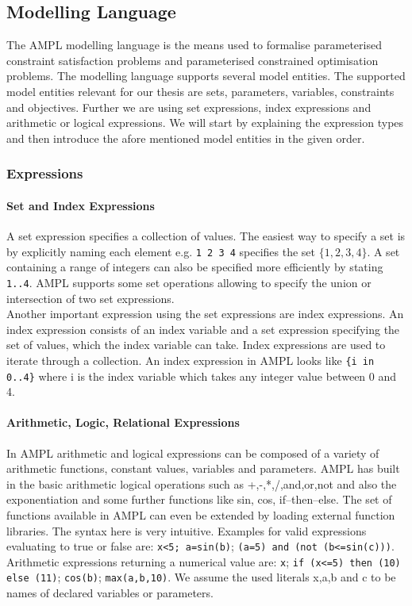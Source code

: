 \subsection{Modelling Language}
The AMPL modelling language is the means used to formalise parameterised constraint satisfaction problems and parameterised constrained optimisation problems. 
The modelling language supports several model entities. The supported model entities relevant for our thesis are sets, parameters, variables, constraints and objectives. Further we are using set expressions, index expressions and arithmetic or logical expressions. We will start by explaining the expression types and then introduce the afore mentioned model entities in the given order.
\subsubsection{Expressions}
\paragraph{Set and Index Expressions}
A set expression specifies a collection of values. The easiest way to specify a set is by explicitly naming each element e.g. \verb&1 2 3 4& specifies the set $\lbrace 1,2,3,4\rbrace$. A set containing a range of integers can also be specified more efficiently by stating \verb&1..4&. AMPL supports some set operations allowing to specify the union or intersection of two set expressions.\\
Another important expression using the set expressions are index expressions. An index expression consists of an index variable and a set expression specifying the set of values, which the index variable can take. Index expressions are used to iterate through a collection. An index expression in AMPL looks like \verb&{i in 0..4}& where i is the index variable which takes any integer value between 0 and 4.
\paragraph{Arithmetic, Logic, Relational Expressions}
In AMPL arithmetic and logical expressions can be composed of a variety of arithmetic functions, constant values, variables and parameters. AMPL has built in the basic arithmetic logical operations such as +,-,*,/,and,or,not and also the exponentiation and some further functions like sin, cos, if--then--else. The set of functions available in AMPL can even be extended by loading external function libraries. The syntax here is very intuitive. Examples for valid expressions evaluating to true or false are:
\verb&x<5; a=sin(b)&; \verb&(a=5) and (not (b<=sin(c)))&. Arithmetic expressions returning a numerical value are: \verb&x&; \verb&if (x<=5) then (10) else (11)&; \verb&cos(b)&; \verb&max(a,b,10)&. 
We assume the used literals x,a,b and c to be names of declared variables or parameters.
